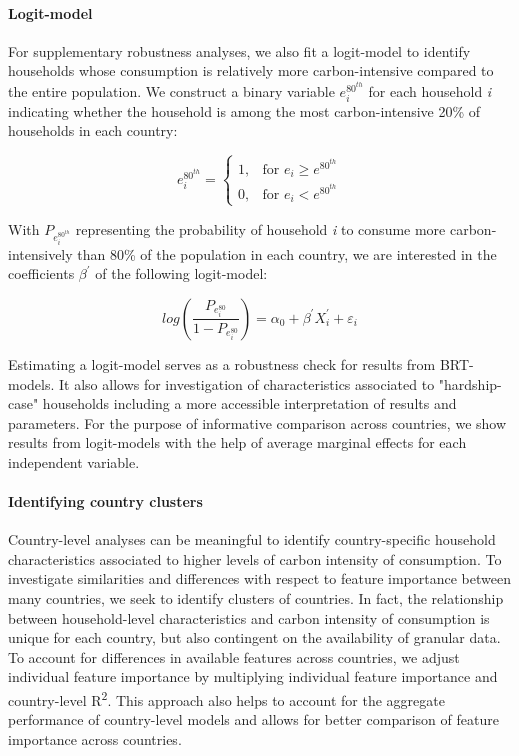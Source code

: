 \documentclass[12pt, a4paper]{article}
\begin{document}
\paragraph{Logit-model} For supplementary robustness analyses, we also fit a logit-model to identify households whose consumption is relatively more carbon-intensive compared to the entire population. We construct a binary variable $e_{i}^{80^{th}}$ for each household \textit{i} indicating whether the household is among the most carbon-intensive 20\% of households in each country:

\begin{equation}\label{eq:logit}
    e_{i}^{80^{th}} =
    \begin{cases}
    1, & \text{for }  e_{i} \geq e^{80^{th}} \\
    0, & \text{for }  e_{i} < e^{80^{th}}
    \end{cases}
\end{equation}

With $P_{e_{i}^{80^{th}}}$ representing the probability of household \textit{i} to consume more carbon-intensively than 80\% of the population in each country, we are interested in the coefficients $\beta^{'}$ of the following logit-model:

\begin{equation} \label{logit}
    log \left( \frac{P_{e_{i}^{80}}}{1 - P_{e_{i}^{80}}} \right) = \alpha_{0} + \beta^{'} X_{i}^{'} + \varepsilon_{i}
\end{equation}

Estimating a logit-model serves as a robustness check for results from BRT-models. It also allows for investigation of characteristics associated to "hardship-case" households including a more accessible interpretation of results and parameters. For the purpose of informative comparison across countries, we show results from logit-models with the help of average marginal effects for each independent variable.

\paragraph{Identifying country clusters} Country-level analyses can be meaningful to identify country-specific household characteristics associated to higher levels of carbon intensity of consumption. To investigate similarities and differences with respect to feature importance between many countries, we seek to identify clusters of countries. In fact, the relationship between household-level characteristics and carbon intensity of consumption is unique for each country, but also contingent on the availability of granular data. To account for differences in available features across countries, we adjust individual feature importance by multiplying individual feature importance and country-level R\textsuperscript{2}. This approach also helps to account for the aggregate performance of country-level models and allows for better comparison of feature importance across countries.
\end{document}
